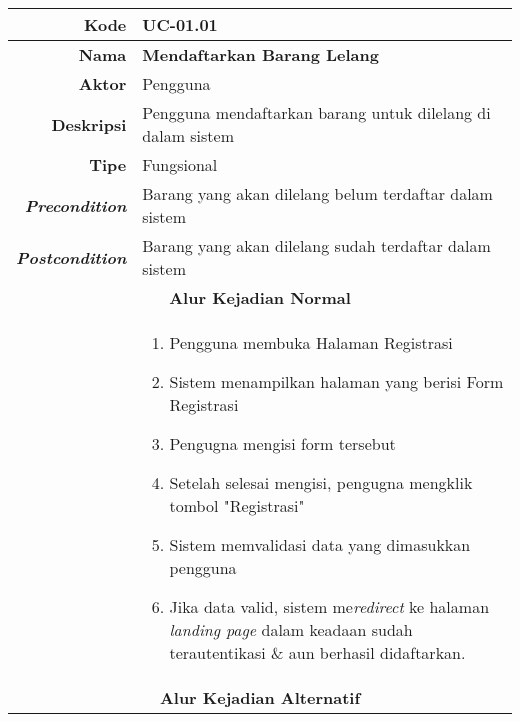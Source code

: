 
\begin{table}[H]
	\centering
\begin{tabular}{|r|p{8cm}|}
		\hline
		\textbf{Kode}                                                    & UC-01.01                                                     \\ \hline
		\textbf{Nama}                                                    & \textbf{Mendaftarkan Barang Lelang}                                         \\ \hline
		\textbf{Aktor}                                                   & Pengguna                                                    \\ \hline
		\textbf{Deskripsi}                                               & Pengguna mendaftarkan barang untuk dilelang di dalam sistem \\ \hline
		\textbf{Tipe}                                                    & Fungsional                                                  \\ \hline
		\textbf{\textit{Precondition}}
			& Barang yang akan dilelang belum terdaftar dalam sistem \\ \hline
		\textbf{\textit{Postcondition}} 
			& Barang yang akan dilelang sudah terdaftar dalam sistem \\ \hline
		\multicolumn{2}{|c|}{\textbf{Alur Kejadian Normal}}                                                                            \\ \hline
		\multicolumn{1}{|l|}{}                                           & 
			\begin{enumerate}
				\item Pengguna membuka Halaman Registrasi
				\item \label{uc0101-show1page}Sistem menampilkan halaman yang berisi Form Registrasi
				\item Pengugna mengisi form tersebut
				\item Setelah selesai mengisi, pengugna mengklik tombol "Registrasi"
				\item \label{al-0101-a} Sistem memvalidasi data yang dimasukkan pengguna
				\item Jika data valid, sistem me\textit{redirect} ke halaman \textit{landing page} dalam keadaan sudah terautentikasi \& aun berhasil didaftarkan.
			\end{enumerate}
		\\ \hline
		\multicolumn{2}{|c|}{\textbf{Alur Kejadian Alternatif}}                                                         \\ \hline

\end{tabular}
\end{table}
